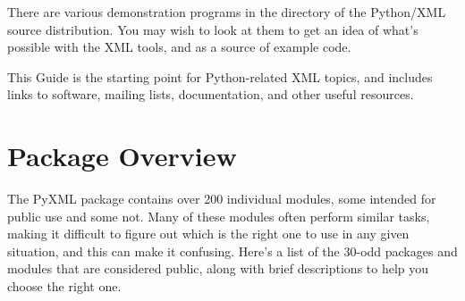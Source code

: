 \documentclass{howto}
\begin{document}
There are various demonstration programs in the  directory
of the Python/XML source distribution.  You may wish to look at them
to get an idea of what's possible with the XML tools, and as a source
of example code.


\begin{seealso}
           {This Guide is the starting point for Python-related XML
            topics, and includes links to software, mailing lists,
            documentation, and other useful resources.}
\end{seealso}


\section{Package Overview}

The PyXML package contains over 200 individual modules, some intended
for public use and some not.  Many of these modules often perform
similar tasks, making it difficult to figure out which is the right
one to use in any given situation, and this can make it confusing.
Here's a list of the 30-odd packages and modules that are considered
public, along with brief descriptions to help you choose the right
one.
\end{document}
